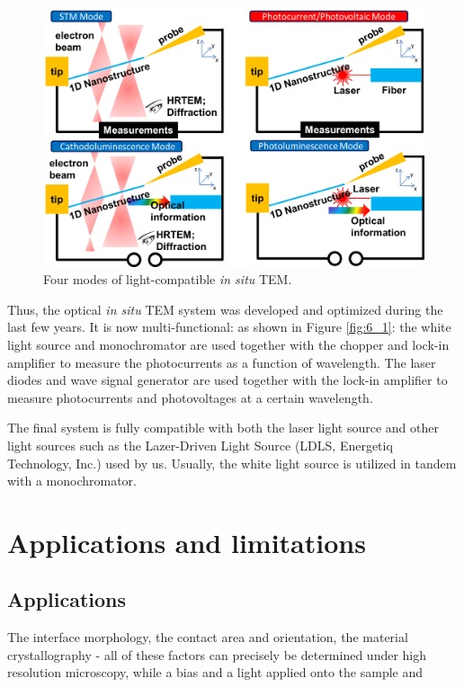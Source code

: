 \begin{figure}  
\centering
\includegraphics[width=\textwidth]{figures/figure2_fourmodes}
\caption[Four modes]{Four modes of light-compatible {\em in situ} TEM.
\label{fig:2_fourmodes}}
\end{figure}

Thus, the optical {\em in situ} TEM system was developed and optimized during the last few years. It is now multi-functional: 
as shown in Figure \ref{fig:6_1}: the white light source and monochromator are used together with the chopper and lock-in amplifier to measure the photocurrents as a function of wavelength. The laser diodes and wave signal generator are used together with the lock-in amplifier to measure photocurrents and photovoltages at a certain wavelength. 

The final system is fully compatible with both the laser light source and other light sources such as the Lazer-Driven Light Source (LDLS, Energetiq Technology, Inc.) used by us. Usually, the white light source is utilized in tandem with a monochromator. 

\section{Applications and limitations}
\subsection{Applications}
 The interface morphology, the contact area and orientation, the material crystallography - all of these factors can precisely be determined under high resolution microscopy, while a bias and a light applied onto the sample and 

